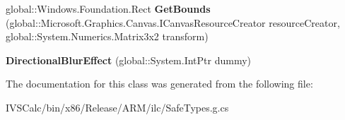 \begin{DoxyCompactItemize}
\item 
\mbox{\label{class_microsoft_1_1_graphics_1_1_canvas_1_1_effects_1_1_directional_blur_effect_a3137686f00a07e07d6981f2a8816c3c1}} 
global\+::\+Windows.\+Foundation.\+Rect {\bfseries Get\+Bounds} (global\+::\+Microsoft.\+Graphics.\+Canvas.\+I\+Canvas\+Resource\+Creator resource\+Creator, global\+::\+System.\+Numerics.\+Matrix3x2 transform)
\item 
\mbox{\label{class_microsoft_1_1_graphics_1_1_canvas_1_1_effects_1_1_directional_blur_effect_aca330745fdae8062acfb902b9cf55db1}} 
{\bfseries Directional\+Blur\+Effect} (global\+::\+System.\+Int\+Ptr dummy)
\end{DoxyCompactItemize}


The documentation for this class was generated from the following file\+:\begin{DoxyCompactItemize}
\item 
I\+V\+S\+Calc/bin/x86/\+Release/\+A\+R\+M/ilc/Safe\+Types.\+g.\+cs\end{DoxyCompactItemize}
